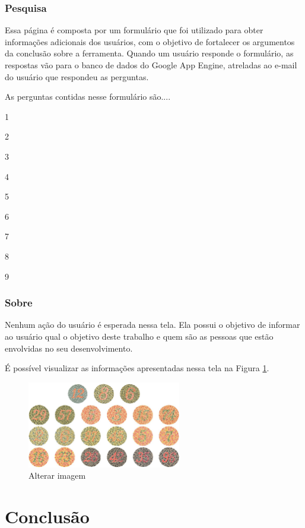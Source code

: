 \documentclass[	12pt, Times, openright, twoside, a4paper, english, brazil]{abntex2}
\begin{document}
\subsection{Pesquisa}

Essa página é composta por um formulário que foi utilizado para obter informações adicionais dos usuários, com o objetivo de fortalecer os argumentos da conclusão sobre a ferramenta. Quando um usuário responde o formulário, as respostas vão para o banco de dados do Google App Engine, atreladas ao e-mail do usuário que respondeu as perguntas.


As perguntas contidas nesse formulário são....

1

2

3

4

5

6

7

8

9

\subsection{Sobre}

Nenhum ação do usuário é esperada nessa tela. Ela possui o objetivo de informar ao usuário qual o objetivo deste trabalho e quem são as pessoas que estão envolvidas no seu desenvolvimento.

É possível visualizar as informações apresentadas nessa tela na Figura \ref{fig:figuraSobre}.

\begin{figure}[!htb]
\centering \includegraphics[width=0.6\textwidth]{pranchas.JPG}
\caption{Alterar imagem} \label{fig:figuraSobre}
\end{figure}

\chapter{Conclusão}
\postextual
\end{document}
